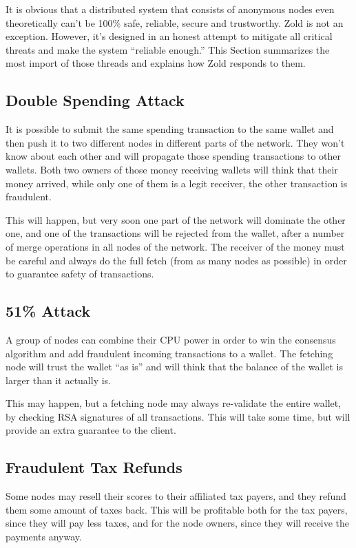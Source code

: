 \documentclass{main}
\begin{document}
It is obvious that a distributed system that consists of anonymous nodes
even theoretically can't be 100\% safe, reliable, secure and trustworthy.
Zold is not an exception. However, it's designed in an honest attempt
to mitigate all critical threats and make the system ``reliable enough.''
This Section summarizes the most import of those threads and explains
how Zold responds to them.

\subsection{Double Spending Attack}

It is possible to submit the same spending transaction to the same wallet
and then push it to two different nodes in different parts of the network.
They won't know about each other and will propagate those spending
transactions to other wallets. Both two owners of those money receiving
wallets will think that their money arrived, while only one of them is
a legit receiver, the other transaction is fraudulent.

This will happen, but very soon one part of the network will dominate the other
one, and one of the transactions will be rejected from the wallet, after
a number of merge operations in all nodes of the network. The receiver of the
money must be careful and always do the full fetch (from as many nodes
as possible) in order to guarantee safety of transactions.

\subsection{51\% Attack}

A group of nodes can combine their CPU power in order to win the consensus
algorithm and add fraudulent incoming transactions to a wallet.
The fetching node will trust the wallet ``as is'' and will think that the
balance of the wallet is larger than it actually is.

This may happen, but a fetching node may always re-validate the entire wallet,
by checking RSA signatures of all transactions. This will take some time, but will
provide an extra guarantee to the client.

\subsection{Fraudulent Tax Refunds}

Some nodes may resell their scores to their affiliated tax payers, and they
refund them some amount of taxes back. This will be profitable both for
the tax payers, since they will pay less taxes, and for the node owners,
since they will receive the payments anyway.
\end{document}
